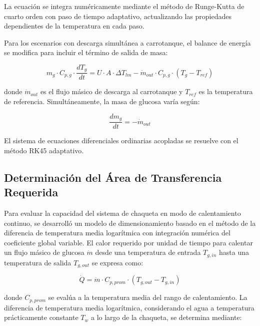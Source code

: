 La ecuaci\'on se integra num\'ericamente mediante el m\'etodo de Runge-Kutta de cuarto orden con paso de tiempo adaptativo, actualizando las propiedades dependientes de la temperatura en cada paso.

Para los escenarios con descarga simult\'anea a carrotanque, el balance de energ\'ia se modifica para incluir el t\'ermino de salida de masa:

\begin{equation}
m_g \cdot C_{p,g} \cdot \frac{dT_g}{dt} = U \cdot A \cdot \Delta T_{lm} - \dot{m}_{out} \cdot C_{p,g} \cdot (T_g - T_{ref})
\label{eq:balance_descarga}
\end{equation}

donde $\dot{m}_{out}$ es el flujo m\'asico de descarga al carrotanque y $T_{ref}$ es la temperatura de referencia. Simult\'aneamente, la masa de glucosa var\'ia seg\'un:

\begin{equation}
\frac{dm_g}{dt} = -\dot{m}_{out}
\label{eq:balance_masa}
\end{equation}

El sistema de ecuaciones diferenciales ordinarias acopladas se resuelve con el m\'etodo RK45 adaptativo.

\subsection{Determinaci\'on del \'Area de Transferencia Requerida}
\label{sec:area_continuo}

Para evaluar la capacidad del sistema de chaqueta en modo de calentamiento continuo, se desarroll\'o un modelo de dimensionamiento basado en el m\'etodo de la diferencia de temperatura media logar\'itmica con integraci\'on num\'erica del coeficiente global variable. El calor requerido por unidad de tiempo para calentar un flujo m\'asico de glucosa $\dot{m}$ desde una temperatura de entrada $T_{g,in}$ hasta una temperatura de salida $T_{g,out}$ se expresa como:

\begin{equation}
\dot{Q} = \dot{m} \cdot C_{p,prom} \cdot (T_{g,out} - T_{g,in})
\label{eq:calor_continuo}
\end{equation}

donde $C_{p,prom}$ se eval\'ua a la temperatura media del rango de calentamiento. La diferencia de temperatura media logar\'itmica, considerando el agua a temperatura pr\'acticamente constante $T_w$ a lo largo de la chaqueta, se determina mediante:


